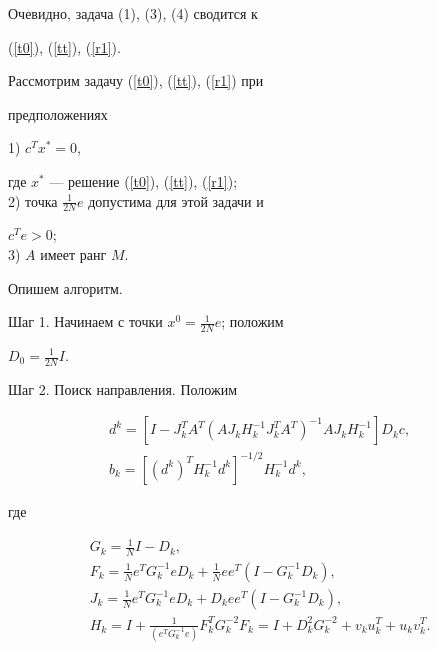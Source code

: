 Очевидно, задача (1), (3), (4) сводится к


(\ref{t0}), (\ref{tt}), (\ref{r1}).





Рассмотрим задачу (\ref{t0}), (\ref{tt}), (\ref{r1}) при


предположениях


\medskip





\noindent{}1) $c^Tx^*=0$,


где $x^*$ --- решение (\ref{t0}), (\ref{tt}), (\ref{r1});\\


2) точка $\frac{1}{2N}e$ допустима для этой задачи и


$c^Te > 0$;\\


3) $A$ имеет ранг $M$.


\medskip





Опишем алгоритм.





Шаг 1. Начинаем с точки $x^0=\frac{1}{2N}e$; положим


$D_0=\frac{1}{2N}I$.





Шаг 2. Поиск направления. Положим


\begin{gather*}


d^k=[I-J^T_kA^T(AJ_kH^{-1}_kJ^T_kA^T)^{-1}AJ_kH^{-1}_k]D_kc, \\


b_k=[(d^k)^TH^{-1}_kd^k]^{-1/2}H^{-1}_kd^k,


\end{gather*}


где


\begin{gather*}


G_k=\frac{1}{N}I-D_k, \\


F_k=\frac{1}{N}e^TG_k^{-1}eD_k+\frac{1}{N}ee^T(I-G^{-1}_kD_k),\\


J_k=\frac{1}{N}e^TG^{-1}_keD_k+D_kee^T(I-G^{-1}_kD_k),\\


H_k=I+\frac{1}{(e^TG^{-1}_ke)}F_k^TG_k^{-2}F_k=


I+D_k^2G_k^{-2}+v_ku_k^T+u_kv_k^T.


\end{gather*}


